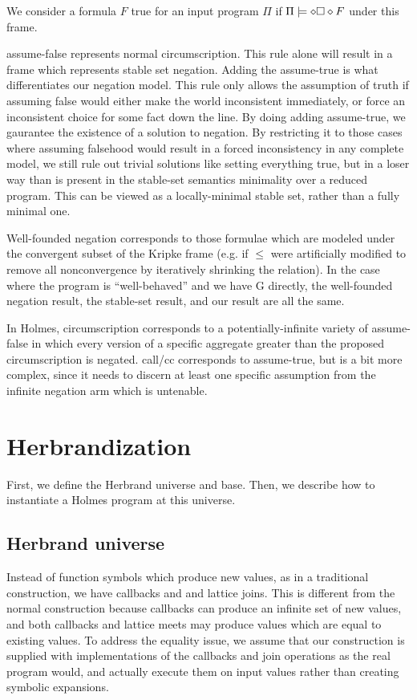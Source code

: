 We consider a formula $F$ true for an input program $\Pi$ if $\Pi \models \diamond \square \diamond F$ under this frame.

assume-false represents normal circumscription.
This rule alone will result in a frame which represents stable set negation.
Adding the assume-true is what differentiates our negation model.
This rule only allows the assumption of truth if assuming false would either make the world inconsistent immediately, or force an inconsistent choice for some fact down the line.
By doing adding assume-true, we gaurantee the existence of a solution to negation.
By restricting it to those cases where assuming falsehood would result in a forced inconsistency in any complete model, we still rule out trivial solutions like setting everything true, but in a loser way than is present in the stable-set semantics minimality over a reduced program.
This can be viewed as a locally-minimal stable set, rather than a fully minimal one.

Well-founded negation corresponds to those formulae which are modeled under the convergent subset of the Kripke frame (e.g. if $\leq$ were artificially modified to remove all nonconvergence by iteratively shrinking the relation).
In the case where the program is ``well-behaved'' and we have G directly, the well-founded negation result, the stable-set result, and our result are all the same. 


In Holmes, circumscription corresponds to a potentially-infinite variety of assume-false in which every version of a specific aggregate greater than the proposed circumscription is negated.
call/cc corresponds to assume-true, but is a bit more complex, since it needs to discern at least one specific assumption from the infinite negation arm which is untenable.

\section{Herbrandization}
\label{sec:herbrand}
First, we define the Herbrand universe and base.
Then, we describe how to instantiate a Holmes program at this universe.

\subsection{Herbrand universe}
Instead of function symbols which produce new values, as in a traditional construction, we have callbacks and and lattice joins.
This is different from the normal construction because callbacks can produce an infinite set of new values, and both callbacks and lattice meets may produce values which are equal to existing values.
To address the equality issue, we assume that our construction is supplied with implementations of the callbacks and join operations as the real program would, and actually execute them on input values rather than creating symbolic expansions.

